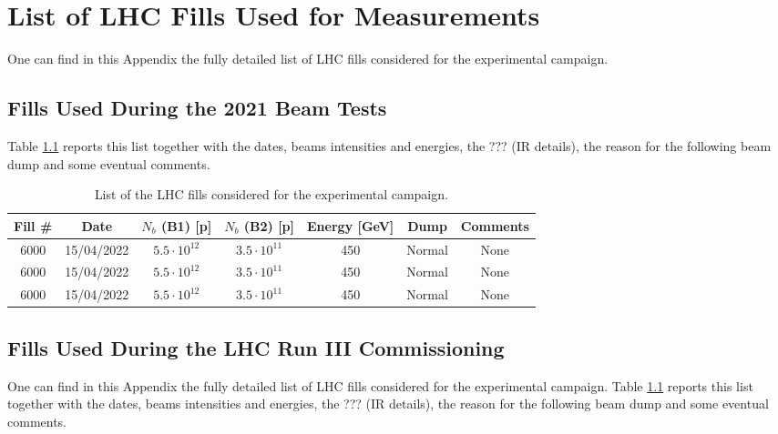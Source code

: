 \chapter{List of LHC Fills Used for Measurements} %

\label{AppendixB} %

One can find in this Appendix the fully detailed list of LHC fills considered for the experimental campaign.



\section{Fills Used During the 2021 Beam Tests}

Table \ref{table:experimental_fills} reports this list together with the dates, beams intensities and energies, the ??? (IR details), the reason for the following beam dump and some eventual comments.

\begin{table}[!hbt]
    \centering
    \begin{tabular}{|c|c|c|c|c|c|c|}
        \toprule
        \textbf{Fill \#} & \textbf{Date} & \textbf{$N_b$ (B1) [p]} & \textbf{$N_b$ (B2) [p]} & \textbf{Energy [GeV]} & \textbf{Dump} & \textbf{Comments} \\
        \midrule
            6000  &  15/04/2022  &  $5.5 \cdot 10^{12}$  &  $3.5 \cdot 10^{11}$  &  450  &  Normal  &  None  \\
            6000  &  15/04/2022  &  $5.5 \cdot 10^{12}$  &  $3.5 \cdot 10^{11}$  &  450  &  Normal  &  None  \\
            6000  &  15/04/2022  &  $5.5 \cdot 10^{12}$  &  $3.5 \cdot 10^{11}$  &  450  &  Normal  &  None  \\
        \bottomrule
    \end{tabular}
    \caption{List of the LHC fills considered for the experimental campaign.}
    \label{table:experimental_fills}
 \end{table}

 \section{Fills Used During the LHC Run III Commissioning}

One can find in this Appendix the fully detailed list of LHC fills considered for the experimental campaign.
Table \ref{table:experimental_fills} reports this list together with the dates, beams intensities and energies, the ??? (IR details), the reason for the following beam dump and some eventual comments.

